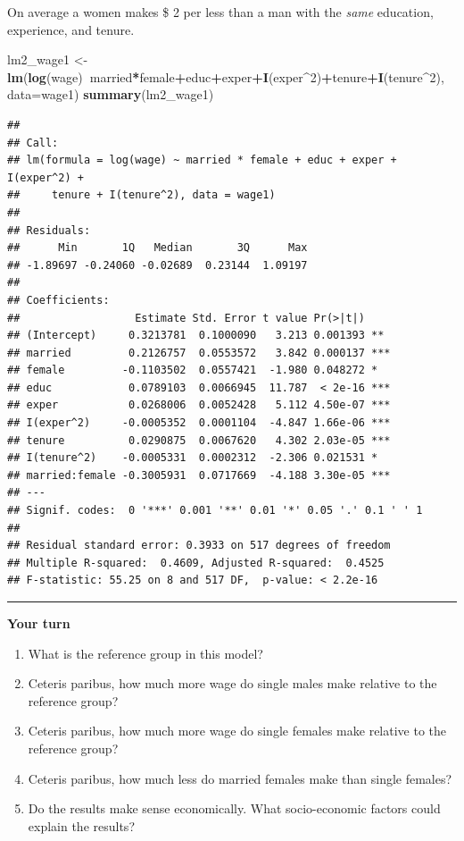 \documentclass[]{book}
\newenvironment{Shaded}{\begin{snugshade}}{\end{snugshade}}
\newcommand{\DataTypeTok}[1]{\textcolor[rgb]{0.13,0.29,0.53}{#1}}
\newcommand{\DecValTok}[1]{\textcolor[rgb]{0.00,0.00,0.81}{#1}}
\newcommand{\KeywordTok}[1]{\textcolor[rgb]{0.13,0.29,0.53}{\textbf{#1}}}
\newcommand{\NormalTok}[1]{#1}
\newcommand{\OperatorTok}[1]{\textcolor[rgb]{0.81,0.36,0.00}{\textbf{#1}}}
\newcommand{\StringTok}[1]{\textcolor[rgb]{0.31,0.60,0.02}{#1}}
\providecommand{\tightlist}{%
  \setlength{\itemsep}{0pt}\setlength{\parskip}{0pt}}
\begin{document}
On average a women makes \$ 2 per less than a man with the \emph{same} education, experience, and tenure.

\begin{Shaded}
\begin{Highlighting}[]
\NormalTok{lm2_wage1 <-}\StringTok{ }\KeywordTok{lm}\NormalTok{(}\KeywordTok{log}\NormalTok{(wage)}\OperatorTok{~}\NormalTok{married}\OperatorTok{*}\NormalTok{female}\OperatorTok{+}\NormalTok{educ}\OperatorTok{+}\NormalTok{exper}\OperatorTok{+}\KeywordTok{I}\NormalTok{(exper}\OperatorTok{^}\DecValTok{2}\NormalTok{)}\OperatorTok{+}\NormalTok{tenure}\OperatorTok{+}\KeywordTok{I}\NormalTok{(tenure}\OperatorTok{^}\DecValTok{2}\NormalTok{), }\DataTypeTok{data=}\NormalTok{wage1)}
\KeywordTok{summary}\NormalTok{(lm2_wage1)}
\end{Highlighting}
\end{Shaded}

\begin{verbatim}
## 
## Call:
## lm(formula = log(wage) ~ married * female + educ + exper + I(exper^2) + 
##     tenure + I(tenure^2), data = wage1)
## 
## Residuals:
##      Min       1Q   Median       3Q      Max 
## -1.89697 -0.24060 -0.02689  0.23144  1.09197 
## 
## Coefficients:
##                  Estimate Std. Error t value Pr(>|t|)    
## (Intercept)     0.3213781  0.1000090   3.213 0.001393 ** 
## married         0.2126757  0.0553572   3.842 0.000137 ***
## female         -0.1103502  0.0557421  -1.980 0.048272 *  
## educ            0.0789103  0.0066945  11.787  < 2e-16 ***
## exper           0.0268006  0.0052428   5.112 4.50e-07 ***
## I(exper^2)     -0.0005352  0.0001104  -4.847 1.66e-06 ***
## tenure          0.0290875  0.0067620   4.302 2.03e-05 ***
## I(tenure^2)    -0.0005331  0.0002312  -2.306 0.021531 *  
## married:female -0.3005931  0.0717669  -4.188 3.30e-05 ***
## ---
## Signif. codes:  0 '***' 0.001 '**' 0.01 '*' 0.05 '.' 0.1 ' ' 1
## 
## Residual standard error: 0.3933 on 517 degrees of freedom
## Multiple R-squared:  0.4609, Adjusted R-squared:  0.4525 
## F-statistic: 55.25 on 8 and 517 DF,  p-value: < 2.2e-16
\end{verbatim}

\begin{center}\rule{0.5\linewidth}{\linethickness}\end{center}

\textbf{Your turn}

\begin{enumerate}
\def\labelenumi{\arabic{enumi}.}
\tightlist
\item
  What is the reference group in this model?
\item
  Ceteris paribus, how much more wage do single males make relative to the reference group?
\item
  Ceteris paribus, how much more wage do single females make relative to the reference group?
\item
  Ceteris paribus, how much less do married females make than single females?
\item
  Do the results make sense economically. What socio-economic factors could explain the results?
\end{enumerate}
\end{document}
